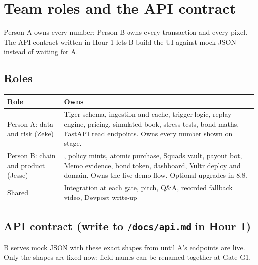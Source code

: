 \documentclass[11pt]{article}
\newcommand{\code}[1]{\texttt{\detokenize{#1}}}
\begin{document}
\section{Team roles and the API contract}

Person A owns every number; Person B owns every transaction and every pixel. The API contract written in Hour 1 lets B build the UI against mock JSON instead of waiting for A.

\subsection{Roles}
{\small
\begin{xltabular}{\linewidth}{@{}L{3.6cm} Y@{}}
\toprule
Role & Owns \\
\midrule
Person A: data and risk (Zeke) & Tiger schema, ingestion and cache, trigger logic, replay engine, pricing, simulated book, stress tests, bond maths, FastAPI read endpoints. Owns every number shown on stage. \\
Person B: chain and product (Jesse) & \code{aUSD}, policy mints, atomic purchase, Squads vault, payout bot, Memo evidence, bond token, dashboard, Vultr deploy and domain. Owns the live demo flow. Optional upgrades in 8.8. \\
Shared & Integration at each gate, pitch, Q\&A, recorded fallback video, Devpost write-up \\
\bottomrule
\end{xltabular}
}

\subsection{API contract (write to \texttt{/docs/api.md} in Hour 1)}
B serves mock JSON with these exact shapes from \code{/web/mocks} until A's endpoints are live. Only the shapes are fixed now; field names can be renamed together at Gate G1.
\end{document}
